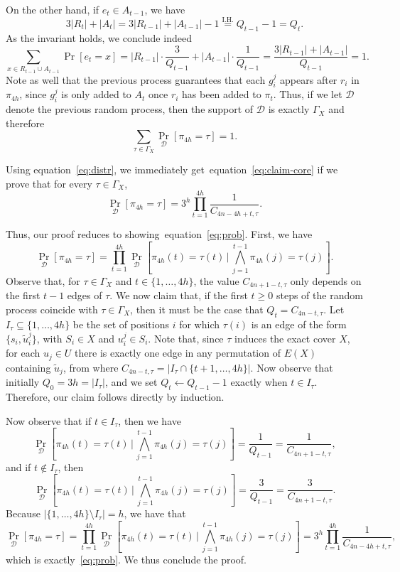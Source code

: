 \documentclass[11pt]{amsart}
\newcommand{\ns}{s}
\newcommand{\nou}{\tilde{u}}
\begin{document}
    On the other hand, if $e_t \in A_{t-1}$, we have
    \[
    3|R_t| + |A_t| = 3|R_{t-1}| + |A_{t-1}| - 1 \overset{\mathrm{I.H.}}{=} Q_{t-1} - 1 = Q_t.
    \]
    As the invariant holds, we conclude indeed 
    \[
    \sum_{x \in R_{t-1} \cup A_{t-1}} \Pr[e_t = x] = |R_{t-1}| \cdot \frac{3}{Q_{t-1}} + |A_{t-1}| \cdot \frac{1}{Q_{t-1}} = \frac{3|R_{t-1}| + |A_{t-1}|}{Q_{t-1}} = 1.
    \]
    Note as well that the previous process guarantees that each $g_i^j$ appears after $r_i$ in $\pi_{4h}$, since $g_i^j$ is only added to $A_{t}$ once $r_i$ has been added to $\pi_t$. Thus,  if we let $\mathcal{D}$ denote the previous random process, then the support of $\mathcal{D}$ is exactly $\Gamma_X$ and therefore
    \begin{equation}\label{eq:distr}
    \sum_{\tau \in \Gamma_X} \Pr_{\mathcal{D}}[\pi_{4h} = \tau] = 1.
      \end{equation}

    Using equation~\eqref{eq:distr}, we immediately  get~equation~\eqref{eq:claim-core} if we  prove  that for every $\tau \in \Gamma_X$,
    \begin{equation}\label{eq:prob}
        \Pr_{\mathcal{D}}[\pi_{4h} = \tau] = 3^h \prod_{t=1}^{4h} \frac{1}{C_{4n-4h+t, \tau}}.
    \end{equation}

    Thus, our proof reduces to showing~equation~\eqref{eq:prob}.
    First, we have
    \[
     \Pr_{\mathcal{D}}[\pi_{4h} = \tau] =  \prod_{t=1}^{4h} \Pr_{\mathcal{D}}\left[\pi_{4h}(t) = \tau(t) \, \Big|\, \bigwedge_{j=1}^{t-1 }\pi_{4h}(j) = \tau(j)\right].
    \]
Observe that, for $\tau \in \Gamma_X$ and $t \in \{1, \dots, 4h\}$, the value $C_{4n+1-t, \tau}$ only depends on the first $t-1$ edges of $\tau$. We now claim that, if the first $t \geq 0$ steps of the random process coincide with $\tau \in \Gamma_X$, then it must be the case that $Q_{t} = C_{4n-t, \tau}$. Let $I_\tau \subseteq \{1, \dots, 4h\}$ be the set of positions $i$ for which $\tau(i)$ is an edge of the form $\{\ns_i, \nou_i^j\}$, with $S_i \in X$ and $u_i^j \in S_i$. Note that, since $\tau$ induces the exact cover $X$, for each $u_j \in U$ there is exactly one edge in any permutation of $E(X)$ containing $\nou_j$, from where 
$C_{4n-t, \tau} = |I_\tau \cap \{t+1, \dots, 4h\}|$. Now observe that initially $Q_0 = 3h = |I_\tau|$, and we set $Q_{t} \gets Q_{t-1} - 1$ exactly when $t \in I_\tau$. Therefore, our claim follows directly by induction.

Now observe that if $t \in I_\tau$, then we have
     \[
     \Pr_{\mathcal{D}}\left[\pi_{4h}(t) = \tau(t) \, \Big|\, \bigwedge_{j=1}^{t-1 }\pi_{4h}(j) = \tau(j)\right] = \frac{1}{Q_{t-1}} = \frac{1}{C_{4n+1-t, \tau}},
   \]
   and if $t \not\in I_\tau$, then 
     \[
     \Pr_{\mathcal{D}}\left[\pi_{4h}(t) = \tau(t) \, \Big|\, \bigwedge_{j=1}^{t-1 }\pi_{4h}(j) = \tau(j)\right] = \frac{3}{Q_{t-1}} = \frac{3}{C_{4n+1-t, \tau}}.
   \]
   Because $\left|\{1, \dots, 4h\} \setminus I_\tau \right| = h$, we have that
    \[
     \Pr_{\mathcal{D}}[\pi_{4h} = \tau] =  \prod_{t=1}^{4h} \Pr_{\mathcal{D}}\left[\pi_{4h}(t) = \tau(t) \, \Big|\, \bigwedge_{j=1}^{t-1 }\pi_{4h}(j) = \tau(j)\right] = 3^{h} \prod_{t=1}^{4h} \frac{1}{C_{4n-4h+t, \tau}},
    \]
which is exactly~\eqref{eq:prob}. We thus conclude the proof.
\end{document}
